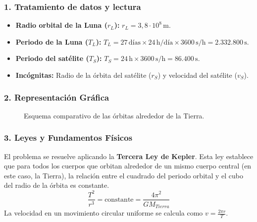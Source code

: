 \subsubsection*{1. Tratamiento de datos y lectura}
\begin{itemize}
    \item \textbf{Radio orbital de la Luna ($r_L$):} $r_L = 3,8\cdot10^8\,\text{m}$.
    \item \textbf{Periodo de la Luna ($T_L$):} $T_L = 27\,\text{días} \times 24\,\text{h/día} \times 3600\,\text{s/h} = 2.332.800\,\text{s}$.
    \item \textbf{Periodo del satélite ($T_S$):} $T_S = 24\,\text{h} \times 3600\,\text{s/h} = 86.400\,\text{s}$.
    \item \textbf{Incógnitas:} Radio de la órbita del satélite ($r_S$) y velocidad del satélite ($v_S$).
\end{itemize}

\subsubsection*{2. Representación Gráfica}
\begin{figure}[H]
    \centering
    \caption{Esquema comparativo de las órbitas alrededor de la Tierra.}
\end{figure}

\subsubsection*{3. Leyes y Fundamentos Físicos}
El problema se resuelve aplicando la \textbf{Tercera Ley de Kepler}. Esta ley establece que para todos los cuerpos que orbitan alrededor de un mismo cuerpo central (en este caso, la Tierra), la relación entre el cuadrado del periodo orbital y el cubo del radio de la órbita es constante.
$$ \frac{T^2}{r^3} = \text{constante} = \frac{4\pi^2}{GM_{Tierra}} $$
La velocidad en un movimiento circular uniforme se calcula como $v = \frac{2\pi r}{T}$.


